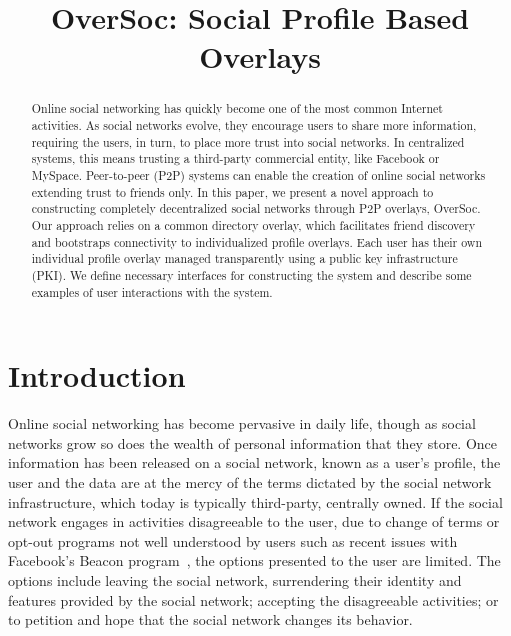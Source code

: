 \documentclass{IEEEtran}
\begin{document}
\title{OverSoc: Social Profile Based Overlays}

\author{
}

\maketitle

\begin{abstract}

Online social networking has quickly become one of the most common Internet
activities.  As social networks evolve, they encourage users to share more
information, requiring the users, in turn, to place more trust into social
networks.  In centralized systems, this means trusting a third-party commercial
entity, like Facebook or MySpace.  Peer-to-peer (P2P) systems can enable the
creation of online social networks extending trust to friends only.  In this
paper, we present a novel approach to constructing completely decentralized
social networks through P2P overlays, OverSoc.  Our approach relies on a common
directory overlay, which facilitates friend discovery and bootstraps
connectivity to individualized profile overlays.  Each user has their own
individual profile overlay managed transparently using a public key
infrastructure (PKI).  We define necessary interfaces for constructing the
system and describe some examples of user interactions with the system.

\end{abstract}

\section{Introduction}

Online social networking has become pervasive in daily life, though as social
networks grow so does the wealth of personal information that they store.
Once information has been released on a social network, known as a user's
profile, the user and the data are at the mercy of the terms dictated by the
social network infrastructure, which today is typically third-party, centrally
owned.  If the social network engages in activities disagreeable to the user,
due to change of terms or opt-out programs not well understood by users such
as recent issues with Facebook's Beacon program~\cite{facebook_beacon}, the
options presented to the user are limited.  The options include leaving the
social network, surrendering their identity and features provided by the social
network; accepting the disagreeable activities; or to petition and hope that
the social network changes its behavior. 
\end{document}
